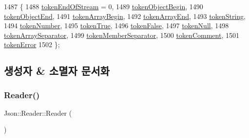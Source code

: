 \begin{DoxyCode}
1487                  \{
1488     \hyperlink{class_json_1_1_reader_aa35e6ab574dc399a0a645ad98ed66bc9a87fd3ad9cae11a8afe2bd022d8ab90f4}{tokenEndOfStream} = 0,
1489     \hyperlink{class_json_1_1_reader_aa35e6ab574dc399a0a645ad98ed66bc9a6196ce743696e6c803b130e8eef970f3}{tokenObjectBegin},
1490     \hyperlink{class_json_1_1_reader_aa35e6ab574dc399a0a645ad98ed66bc9a12d03a3a710b2d3f1384889df3da887d}{tokenObjectEnd},
1491     \hyperlink{class_json_1_1_reader_aa35e6ab574dc399a0a645ad98ed66bc9a366d1a18459ad0c3b5bd32a35391e35a}{tokenArrayBegin},
1492     \hyperlink{class_json_1_1_reader_aa35e6ab574dc399a0a645ad98ed66bc9a9adc87fd67f5fc21391a4be89382a316}{tokenArrayEnd},
1493     \hyperlink{class_json_1_1_reader_aa35e6ab574dc399a0a645ad98ed66bc9ace89d4e0342535b8c00104ed4e5e0cee}{tokenString},
1494     \hyperlink{class_json_1_1_reader_aa35e6ab574dc399a0a645ad98ed66bc9a9b1717bee03ce7016f507bd4598fa5c6}{tokenNumber},
1495     \hyperlink{class_json_1_1_reader_aa35e6ab574dc399a0a645ad98ed66bc9acec3234e26f2d6bf206187fc5d949a03}{tokenTrue},
1496     \hyperlink{class_json_1_1_reader_aa35e6ab574dc399a0a645ad98ed66bc9ac24318c0842c7653c3555a82437b8eb2}{tokenFalse},
1497     \hyperlink{class_json_1_1_reader_aa35e6ab574dc399a0a645ad98ed66bc9a11bd0ba1c34448d075022b89d5bf9853}{tokenNull},
1498     \hyperlink{class_json_1_1_reader_aa35e6ab574dc399a0a645ad98ed66bc9af2c235e8da86f11ffb1a1243e49ed1fa}{tokenArraySeparator},
1499     \hyperlink{class_json_1_1_reader_aa35e6ab574dc399a0a645ad98ed66bc9a08227b96f54242f4f9a8a597403c4424}{tokenMemberSeparator},
1500     \hyperlink{class_json_1_1_reader_aa35e6ab574dc399a0a645ad98ed66bc9ae4fcf05c3b1ce462bacd34af0ccac32b}{tokenComment},
1501     \hyperlink{class_json_1_1_reader_aa35e6ab574dc399a0a645ad98ed66bc9a55d1ab9135c3d068b57fafdbabfa569a}{tokenError}
1502   \};
\end{DoxyCode}


\subsection{생성자 \& 소멸자 문서화}
\mbox{\label{class_json_1_1_reader_a0b3c4e24c8393354bab57a6ba3ffc27f}} 
\subsubsection{\texorpdfstring{Reader()}{Reader()}\hspace{0.1cm}{\footnotesize\ttfamily [1/2]}}
{\footnotesize\ttfamily Json\+::\+Reader\+::\+Reader (\begin{DoxyParamCaption}{ }\end{DoxyParamCaption})}



